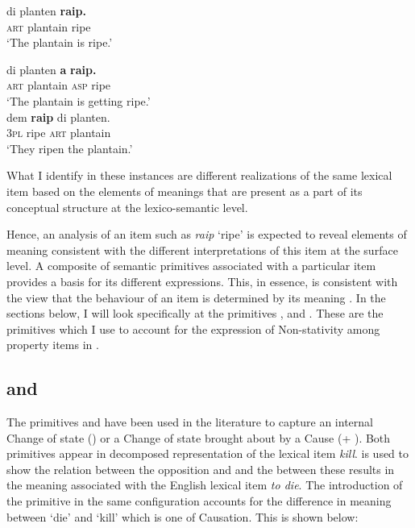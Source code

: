 \ea%
\label{ex:4:10}
\ea
\gll di planten \textbf{raip.}\\
\textsc{art} plantain ripe\\
\glt `The plantain is ripe.'

\ex
\gll di planten \textbf{a} \textbf{raip.} \\
\textsc{art} plantain \textsc{asp} ripe\\
\glt  `The plantain is getting ripe.'\\


\ex
\gll dem \textbf{raip} di planten.\\
\textsc{3pl} ripe \textsc{art} plantain\\
\glt  `They ripen the plantain.' \\
\z \z

What I identify in these instances are different realizations of the
same lexical item based on the elements of meanings that are present
as a part of its conceptual structure at the lexico-semantic level.

Hence, an analysis of an item such as \textit{raip} `ripe' is expected
to reveal elements of meaning consistent with the different
interpretations of this item at the surface level.  A composite of
semantic primitives associated with a particular item provides a basis
for its different expressions.  This, in essence, is consistent with the
view that the behaviour of an item is determined by its meaning
\citep[1]{Levin1993}.  In the sections below, I will look
specifically at the primitives \BECOME, \CAUSE and \DO.  These are the
primitives which I use to account for the expression of Non-stativity
among property items in .

\subsection{\BECOME and \CAUSE}\label{sec:4.3.1}

The primitives \BECOME and \CAUSE have been used in the literature to
capture an internal Change of state (\BECOME) or a Change of state
brought about by a Cause (\CAUSE + \BECOME).  Both primitives appear in
 decomposed representation of the lexical item
\textit{kill}. \BECOME is used to show the relation between the opposition
\ALIVE and \DEAD and the  between these results in the
meaning associated with the English lexical item \textit{to die}.  The
introduction of the primitive \CAUSE in the same configuration accounts
for the difference in meaning between `die' and `kill' which is one of
Causation.  This is shown below:

